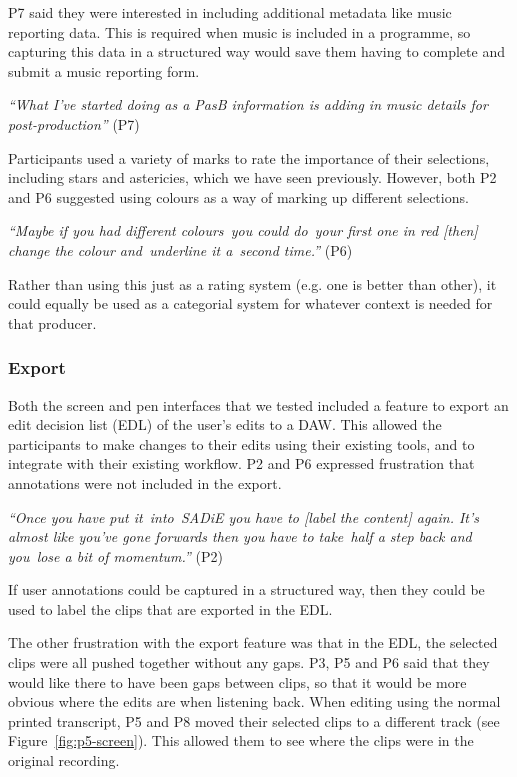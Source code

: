 P7 said they were interested in including additional metadata like music reporting data. This is required when music is
included in a programme, so capturing this data in a structured way would save them having to complete and submit a
music reporting form.

\textit{``What I've started doing as a PasB information is adding in music details for post-production''} (P7)


Participants used a variety of marks to rate the importance of their selections, including stars and astericies, which
we have seen previously. However, both P2 and P6 suggested using colours as a way of marking up different selections.

\textit{``Maybe if you had different colours you could do your first one in red [then]
change the colour and underline it a second time.''} (P6)

Rather than using this just as a rating system (e.g. one is better than other), it could equally be used as a
categorial system for whatever context is needed for that producer.

\subsubsection{Export}

Both the screen and pen interfaces that we tested included a feature to export an edit decision list (EDL) of the
user's edits to a DAW. This allowed the participants to make changes to their edits using their existing tools, and to
integrate with their existing workflow.  P2 and P6 expressed frustration that annotations were not included in the
export.

\textit{``Once you have put it into SADiE you have to [label the content] again. It's almost like you've gone forwards
then you have to take half a step back and you lose a bit of momentum.''} (P2)

If user annotations could be captured in a structured way, then they could be used to label the clips that are exported
in the EDL.

The other frustration with the export feature was that in the EDL, the selected clips were all pushed together without
any gaps. P3, P5 and P6 said that they would like there to have been gaps between clips, so that it would be more
obvious where the edits are when listening back. When editing using the normal printed transcript, P5 and P8 moved
their selected clips to a different track (see Figure~\ref{fig:p5-screen}). This allowed them to see where the clips
were in the original recording.

